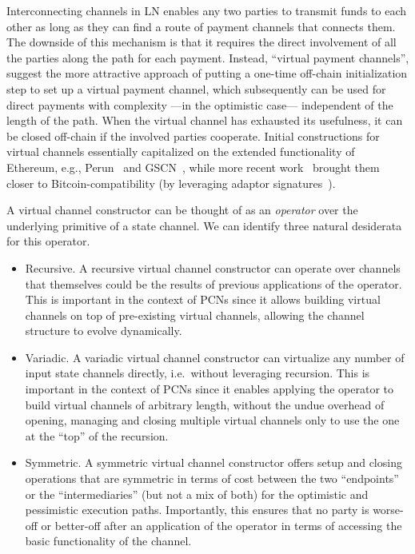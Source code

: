 Interconnecting channels in LN enables any two parties to transmit funds
to each other as long as they can find a route of payment channels that connects
them. The downside of this mechanism is that it requires the direct involvement
of all the parties along the path for each payment. Instead, ``virtual payment
channels'', suggest the more attractive approach of putting a one-time off-chain
initialization step to set up a virtual payment channel, which subsequently can
be used for direct payments with complexity ---in the optimistic case---
independent of the length of the path. When the virtual channel has exhausted
its usefulness, it can be closed off-chain if the involved parties cooperate.
Initial constructions for virtual channels essentially capitalized on the extended functionality of Ethereum, e.g.,
Perun~\cite{perun} and GSCN~\cite{DBLP:conf/ccs/DziembowskiFH18}, while more
recent work~\cite{9519487} brought them closer to
Bitcoin-compatibility (by leveraging adaptor
signatures~\cite{DBLP:journals/iacr/AumayrEEFHMMR20}).

A virtual channel constructor can be thought of as an \emph{operator} over the
underlying primitive of a state channel. We can identify three natural
desiderata for this operator.

\begin{itemize}
\item Recursive. A recursive virtual channel constructor can operate over
channels that themselves could be the results of previous applications of the
operator. This is important in the context of PCNs since it allows building
virtual channels on top of pre-existing virtual channels, allowing the channel
structure to evolve dynamically.
\item Variadic. A variadic virtual channel constructor can virtualize any number
of input state channels directly, i.e.\ without leveraging recursion. This is
important in the context of PCNs since it enables applying the operator to build
virtual channels of arbitrary length, without the undue overhead of opening,
managing and closing multiple virtual channels only to use the one at the
``top'' of the recursion.
\item Symmetric. A symmetric virtual channel constructor offers setup and
closing operations that are symmetric in terms of cost between the two
``endpoints'' or the ``intermediaries'' (but not a mix of both) for the
optimistic and pessimistic execution paths. Importantly, this ensures that no party is worse-off or better-off after an application of the operator in terms of accessing the basic functionality of the channel. 
\end{itemize}

